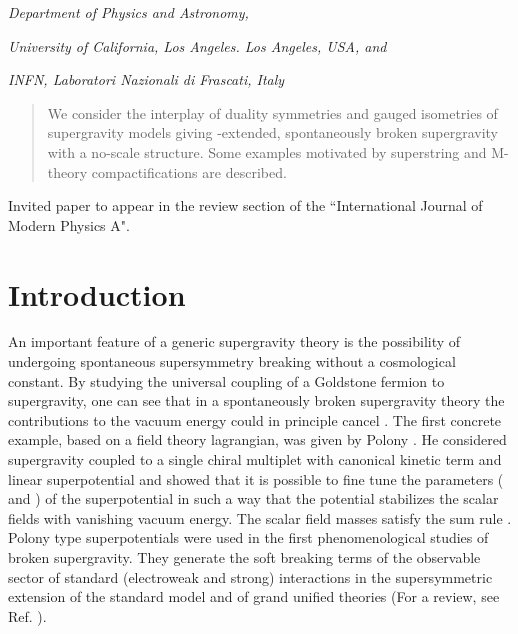 \documentclass[a4paper,12pt]{article}
\begin{document}
\bigskip




\centerline{\myHighlight{$^\star$}\coordHE{}\it Department of Physics and Astronomy,} \centerline{\it University of
California,
Los Angeles. Los Angeles, USA, and} \centerline{\it INFN, Laboratori
Nazionali di
Frascati, Italy}







\vskip 1.5cm

\begin{abstract}
We consider the interplay of duality symmetries and gauged isometries of supergravity models giving
\coordHE{}-extended, spontaneously broken supergravity with a no-scale structure. Some examples motivated by
 superstring and M-theory compactifications are described.
\end{abstract}

\vskip 1.5cm

Invited paper to appear in the review section of the
``International Journal of Modern Physics A".

 \vfill\eject


\section{Introduction}

An important feature of a generic supergravity theory is the
possibility of undergoing spontaneous supersymmetry breaking
without a cosmological constant. By studying the universal
coupling of a Goldstone fermion to supergravity, one can see that
in a spontaneously broken supergravity theory the contributions
to the vacuum energy could in principle cancel \cite{dz}. The
first concrete example, based on a field theory lagrangian, was
given by Polony \cite{po,cjsfgvn}. He considered \coordHE{}
supergravity coupled to a single chiral multiplet with canonical
kinetic term and linear superpotential and showed that it is
possible to fine tune the parameters (\myHighlight{$\alpha$}\coordHE{} and \myHighlight{$\beta$}\coordHE{}) of the
superpotential \coordHE{} in such a way that the potential
stabilizes the scalar fields with vanishing vacuum energy.
 The scalar field masses satisfy the sum rule \coordHE{} \cite{cjsfgvn}.
 Polony type superpotentials were used in the first phenomenological studies of broken
supergravity. They generate the soft breaking terms of the observable sector of standard
(electroweak and strong) interactions in the supersymmetric extension of the standard model
and of grand unified theories (For a review, see Ref. \cite{ni}).
\end{document}
